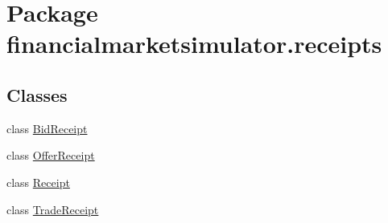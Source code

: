 \hypertarget{namespacefinancialmarketsimulator_1_1receipts}{\section{Package financialmarketsimulator.\+receipts}
\label{namespacefinancialmarketsimulator_1_1receipts}
}
\subsection*{Classes}
\begin{DoxyCompactItemize}
\item 
class \hyperlink{classfinancialmarketsimulator_1_1receipts_1_1_bid_receipt}{Bid\+Receipt}
\item 
class \hyperlink{classfinancialmarketsimulator_1_1receipts_1_1_offer_receipt}{Offer\+Receipt}
\item 
class \hyperlink{classfinancialmarketsimulator_1_1receipts_1_1_receipt}{Receipt}
\item 
class \hyperlink{classfinancialmarketsimulator_1_1receipts_1_1_trade_receipt}{Trade\+Receipt}
\end{DoxyCompactItemize}
